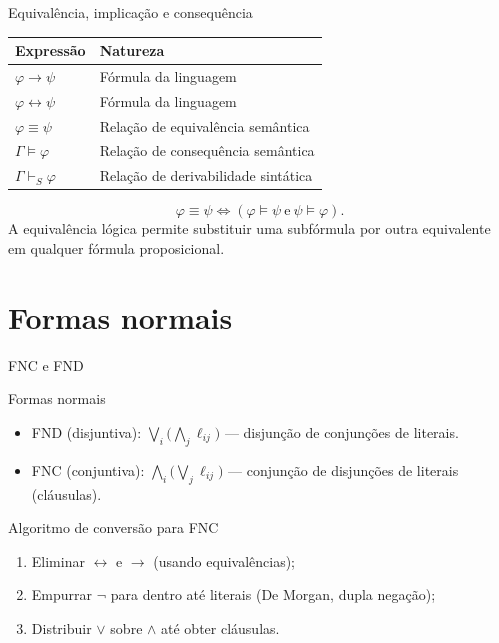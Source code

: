 \documentclass[10pt,aspectratio=169]{beamer}
\newcommand{\dest}[1]{\alert{#1}}
\begin{document}

\begin{frame}{Equivalência, implicação e consequência}

\renewcommand{\arraystretch}{1.55}
\begin{tabular}{ll}
\toprule
Expressão & Natureza\\\midrule
$\varphi\to\psi$ & Fórmula da linguagem\\
$\varphi\leftrightarrow\psi$ & Fórmula da linguagem\\
$\varphi\equiv\psi$ & Relação de equivalência semântica\\
$\Gamma\models\varphi$ & Relação de consequência semântica\\
$\Gamma\vdash_S\varphi$ & Relação de derivabilidade sintática\\\bottomrule
\end{tabular}\par
\[\varphi\equiv\psi\iff
(\varphi\models\psi\ \text{e}\ \psi\models\varphi).\]
A equivalência lógica permite substituir uma subfórmula por outra equivalente em qualquer fórmula proposicional.
\end{frame}

\section{Formas normais}
\begin{frame}{FNC e FND}
  \begin{block}{Formas normais}
    \begin{itemize}
      \item \dest{FND} (disjuntiva): $\bigvee_i \big(\bigwedge_j \ell_{ij}\big)$ — disjunção de conjunções de literais.
      \item \dest{FNC} (conjuntiva): $\bigwedge_i \big(\bigvee_j \ell_{ij}\big)$ — conjunção de disjunções de literais (cláusulas).
    \end{itemize}
  \end{block}
  \begin{alertblock}{Algoritmo de conversão para FNC}
    \begin{enumerate}
      \item Eliminar $\leftrightarrow$ e $\rightarrow$ (usando equivalências);
      \item Empurrar $\neg$ para dentro até literais (De Morgan, dupla negação);
      \item Distribuir $\lor$ sobre $\land$ até obter cláusulas.
    \end{enumerate}
  \end{alertblock}
\end{frame}
\end{document}
